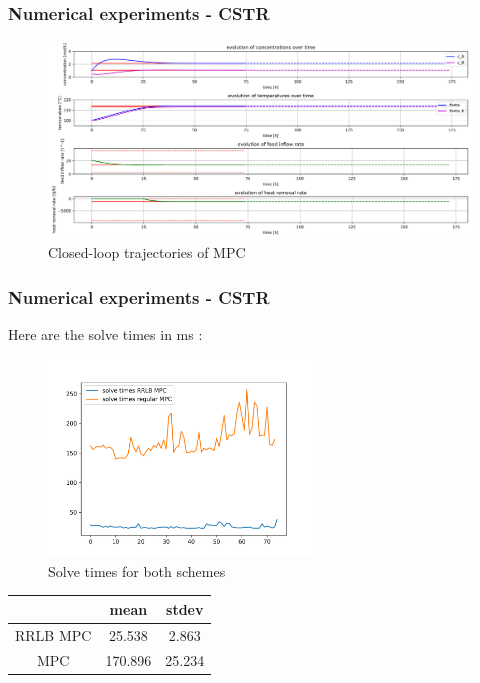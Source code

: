 \documentclass[10pt]{beamer}
\begin{document}
\begin{frame}
    \frametitle{Numerical experiments - CSTR}
    \begin{figure}[H]
        \centering
        \includegraphics[width=1.0\textwidth]{../cstr_package/mpc.png}
        \caption*{Closed-loop trajectories of MPC}
    \end{figure}
\end{frame}

\begin{frame}
    \frametitle{Numerical experiments - CSTR}    
    Here are the solve times in ms :\newline
    \begin{minipage}{0.55\textwidth}
        \begin{figure}[H]
            \centering
            \includegraphics[width=7cm]{../cstr_package/solve_times.png}
            \caption*{Solve times for both schemes}
        \end{figure}
    \end{minipage}
    \begin{minipage}{0.40\textwidth}
        \begin{table}[H]
            \centering
            \begin{tabular}{|c|c|c|}
                \hline
                & mean & stdev\\
                \hline
                RRLB MPC & 25.538 & 2.863 \\
                \hline
                MPC & 170.896 & 25.234 \\
                \hline
              \end{tabular}
        \end{table}
    \end{minipage}
\end{frame}
\end{document}
